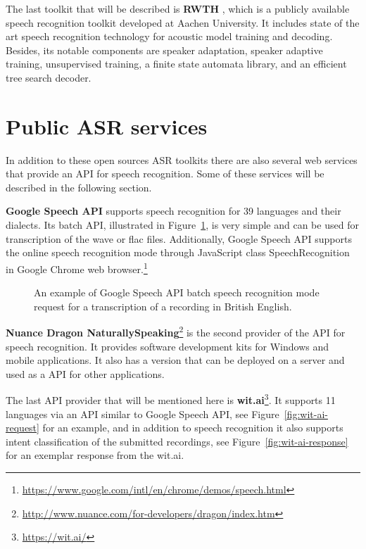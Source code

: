 The last toolkit that will be described is \textbf{RWTH} \cite{rybach2009rwth},
  which is a publicly available speech recognition toolkit developed at Aachen University.
It includes state of the art speech recognition technology for acoustic model training and decoding.
Besides, its notable components are speaker adaptation,
  speaker adaptive training,
  unsupervised training,
  a finite state automata library,
  and an efficient tree search decoder.


\section{Public ASR services}
In addition to these open sources ASR toolkits
  there are also several web services that provide an API for speech recognition.
Some of these services will be described in the following section.

\textbf{Google Speech API} supports speech recognition for 39 languages and their dialects.
Its batch API, illustrated in Figure~\ref{fig:google-api}, is very simple and can be used for transcription of the wave or flac files.
Additionally,
  Google Speech API supports the online speech recognition mode through JavaScript class SpeechRecognition in Google Chrome web browser.\footnote{\url{https://www.google.com/intl/en/chrome/demos/speech.html}}

\begin{figure}[h]
  

  \caption{An example of Google Speech API batch speech recognition mode request for a transcription of a recording in British English.}
  \label{fig:google-api}
\end{figure}


\textbf{Nuance Dragon NaturallySpeaking}\footnote{\url{http://www.nuance.com/for-developers/dragon/index.htm}}
  is the second provider of the API for speech recognition.
It provides software development kits for Windows and mobile applications.
It also has a version that can be deployed on a server and used as a API for other applications.


The last API provider that will be mentioned here is \textbf{wit.ai}\footnote{\url{https://wit.ai/}}.
It supports 11 languages via an API similar to Google Speech API, see Figure~\ref{fig:wit-ai-request} for an example,
  and in addition to speech recognition it also supports intent classification of the submitted recordings,
  see Figure~\ref{fig:wit-ai-response} for an exemplar response from the wit.ai.

